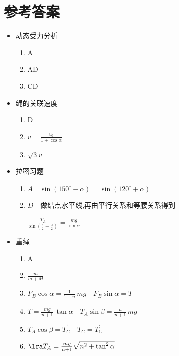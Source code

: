 \documentclass{article}
\begin{document}
\newpage

\section{参考答案}

\begin{minipage}{0.5\textwidth}
    \begin{itemize}
        \item 动态受力分析
              \begin{enumerate}
                  \item A
                  \item AD
                  \item CD
              \end{enumerate}
        \item 绳的关联速度
              \begin{enumerate}
                  \item D
                  \item $v = \frac{v_{0}}{1+\cos{\alpha}}$
                  \item $\sqrt{3}v$
              \end{enumerate}

        \item 拉密习题
              \begin{enumerate}
                  \item $A \quad \sin{(150^{\circ} - \alpha)} = \sin{(120^{\circ} + \alpha)}$
                  \item $D \quad \text{做结点水平线,再由平行关系和等腰关系得到}$
                  
                  $\frac{T_{A}}{\sin{(\frac{\pi}{2} + \frac{\alpha}{2})}} = \frac{mg}{\sin{\alpha}}$
              \end{enumerate}

        \item 重绳
              \begin{enumerate}
                  \item A
                  \item $\frac{m}{m+M}$
                  \item $F_{B} \cos{\alpha} = \frac{1}{1+n} \, mg \quad F_{B} \sin{\alpha} = T$ 
                  \item[]$T = \frac{mg}{n+1} \, \tan{\alpha}    \quad T_{A} \sin{\beta} = \frac{n}{n+1} \, mg$
                  \item[]$T_{A} \cos{\beta} = T^{'}_{C} \quad T_{C} = T^{'}_{C}$
                  \item[]$\lra T_{A} = \frac{mg}{n+1} \sqrt{n^{2} + \tan^{2}{\alpha}}$
              \end{enumerate}
    \end{itemize}
\end{minipage}
\end{document}
